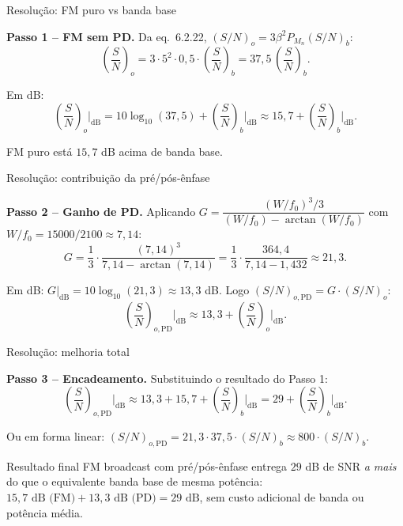 \begin{frame}{Resolução: FM puro vs banda base}

\textbf{Passo 1 -- FM sem PD.} Da eq.~6.2.22, $(S/N)_o = 3\beta^2 P_{M_n} (S/N)_b$:
\[
\left(\frac{S}{N}\right)_o = 3 \cdot 5^2 \cdot 0{,}5 \cdot \left(\frac{S}{N}\right)_b = 37{,}5\,\left(\frac{S}{N}\right)_b.
\]

Em dB:
\[
\left(\frac{S}{N}\right)_o\bigg|_{\text{dB}} = 10\log_{10}(37{,}5) + \left(\frac{S}{N}\right)_b\bigg|_{\text{dB}} \approx 15{,}7 + \left(\frac{S}{N}\right)_b\bigg|_{\text{dB}}.
\]

FM puro está $15{,}7$ dB acima de banda base.

\end{frame}


\begin{frame}{Resolução: contribuição da pré/pós-ênfase}

\textbf{Passo 2 -- Ganho de PD.} Aplicando $G = \dfrac{(W/f_0)^3 / 3}{(W/f_0) - \arctan(W/f_0)}$ com $W/f_0 = 15000/2100 \approx 7{,}14$:
\[
G = \frac{1}{3}\cdot\frac{(7{,}14)^3}{7{,}14 - \arctan(7{,}14)}
   = \frac{1}{3}\cdot\frac{364{,}4}{7{,}14 - 1{,}432}
   \approx 21{,}3.
\]

Em dB: $G\big|_{\text{dB}} = 10\log_{10}(21{,}3) \approx 13{,}3$ dB. Logo $(S/N)_{o,\text{PD}} = G \cdot (S/N)_o$:
\[
\left(\frac{S}{N}\right)_{o,\text{PD}}\bigg|_{\text{dB}} \approx 13{,}3 + \left(\frac{S}{N}\right)_o\bigg|_{\text{dB}}.
\]

\end{frame}


\begin{frame}{Resolução: melhoria total}

\textbf{Passo 3 -- Encadeamento.} Substituindo o resultado do Passo 1:
\[
\left(\frac{S}{N}\right)_{o,\text{PD}}\bigg|_{\text{dB}}
\approx 13{,}3 + 15{,}7 + \left(\frac{S}{N}\right)_b\bigg|_{\text{dB}}
= 29 + \left(\frac{S}{N}\right)_b\bigg|_{\text{dB}}.
\]

Ou em forma linear: $(S/N)_{o,\text{PD}} = 21{,}3 \cdot 37{,}5 \cdot (S/N)_b \approx 800 \cdot (S/N)_b$.

\begin{block}{Resultado final}
FM broadcast com pré/pós-ênfase entrega $29$ dB de SNR \emph{a mais} do que o equivalente banda base de mesma potência: $\boxed{15{,}7 \text{ dB (FM)} + 13{,}3 \text{ dB (PD)} = 29 \text{ dB}}$, sem custo adicional de banda ou potência média.
\end{block}

\end{frame}

